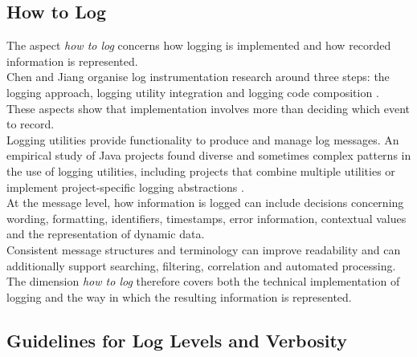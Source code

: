\subsection{How to Log}
\label{subsec:how_to_log}

The aspect \textit{how to log} concerns how logging is implemented and how recorded information is represented.
\\
Chen and Jiang organise log instrumentation research around three steps: the logging approach, 
logging utility integration and logging code composition \cite{chen2021asurveyofsoftwareloginstrumentation}. 
These aspects show that implementation involves more than deciding which event to record.
\\
Logging utilities provide functionality to produce and manage log messages. 
An empirical study of Java projects found diverse and sometimes complex patterns in the use of logging utilities, 
including projects that combine multiple utilities or implement project-specific logging abstractions 
\cite{chen2020studyingtheuseofjavaloggingutilities}.
\\
At the message level, how information is logged can include decisions concerning wording, 
formatting, identifiers, timestamps, error information, contextual values and the representation of dynamic data.
\\
Consistent message structures and terminology can improve readability and can additionally support searching,
filtering, correlation and automated processing.
\\
The dimension \textit{how to log} therefore covers both the technical implementation of logging 
and the way in which the resulting information is represented.


\subsection{Guidelines for Log Levels and Verbosity}
\label{subsec:verbosity_guidelines}

